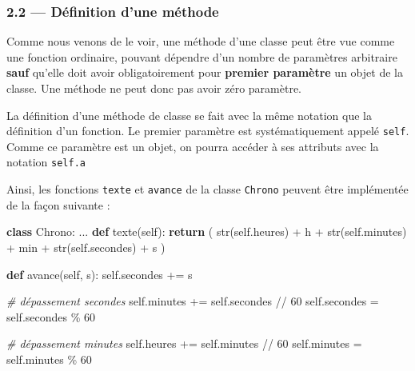 \documentclass[a4paper,17pt]{extarticle}
\newenvironment{Shaded}{}{}
\newcommand{\KeywordTok}[1]{\textcolor[rgb]{0.00,0.44,0.13}{\textbf{{#1}}}}
\newcommand{\DecValTok}[1]{\textcolor[rgb]{0.25,0.63,0.44}{{#1}}}
\newcommand{\StringTok}[1]{\textcolor[rgb]{0.25,0.44,0.63}{{#1}}}
\newcommand{\CommentTok}[1]{\textcolor[rgb]{0.38,0.63,0.69}{\textit{{#1}}}}
\newcommand{\NormalTok}[1]{{#1}}
\newcommand{\VariableTok}[1]{\textcolor[rgb]{0.10,0.09,0.49}{{#1}}}
\newcommand{\ControlFlowTok}[1]{\textcolor[rgb]{0.00,0.44,0.13}{\textbf{{#1}}}}
\newcommand{\OperatorTok}[1]{\textcolor[rgb]{0.40,0.40,0.40}{{#1}}}
\newcommand{\BuiltInTok}[1]{{#1}}
\begin{document}
    \hypertarget{duxe9finition-dune-muxe9thode}{%
\subsubsection{2.2 --- Définition d'une
méthode}\label{duxe9finition-dune-muxe9thode}}

    Comme nous venons de le voir, une méthode d'une classe peut être vue
comme une fonction ordinaire, pouvant dépendre d'un nombre de paramètres
arbitraire \textbf{sauf} qu'elle doit avoir obligatoirement pour
\textbf{premier paramètre} un objet de la classe. Une méthode ne peut
donc pas avoir zéro paramètre.

La définition d'une méthode de classe se fait avec la même notation que
la définition d'un fonction. Le premier paramètre est systématiquement
appelé \texttt{self}. Comme ce paramètre est un objet, on pourra accéder
à ses attributs avec la notation \texttt{self.a}
\begin{exemple}
    Ainsi, les fonctions \texttt{texte} et \texttt{avance} de la classe
\texttt{Chrono} peuvent être implémentée de la façon suivante :

\begin{Shaded}
\begin{Highlighting}[]
\KeywordTok{class}\NormalTok{ Chrono:}
\NormalTok{    ...}
    \KeywordTok{def}\NormalTok{ texte(}\VariableTok{self}\NormalTok{):}
        \ControlFlowTok{return}\NormalTok{ (  }\BuiltInTok{str}\NormalTok{(}\VariableTok{self}\NormalTok{.heures)   }\OperatorTok{+} \StringTok{\textquotesingle{}h \textquotesingle{}}
                \OperatorTok{+} \BuiltInTok{str}\NormalTok{(}\VariableTok{self}\NormalTok{.minutes)  }\OperatorTok{+} \StringTok{\textquotesingle{}min \textquotesingle{}}
                \OperatorTok{+} \BuiltInTok{str}\NormalTok{(}\VariableTok{self}\NormalTok{.secondes) }\OperatorTok{+} \StringTok{\textquotesingle{}s\textquotesingle{}}\NormalTok{   )}

    \KeywordTok{def}\NormalTok{ avance(}\VariableTok{self}\NormalTok{, s):}
        \VariableTok{self}\NormalTok{.secondes }\OperatorTok{+=}\NormalTok{ s}
        
        \CommentTok{\# dépassement secondes}
        \VariableTok{self}\NormalTok{.minutes }\OperatorTok{+=} \VariableTok{self}\NormalTok{.secondes }\OperatorTok{//} \DecValTok{60}
        \VariableTok{self}\NormalTok{.secondes }\OperatorTok{=} \VariableTok{self}\NormalTok{.secondes }\OperatorTok{\%}  \DecValTok{60}

        \CommentTok{\# dépassement minutes}
        \VariableTok{self}\NormalTok{.heures }\OperatorTok{+=} \VariableTok{self}\NormalTok{.minutes }\OperatorTok{//} \DecValTok{60}
        \VariableTok{self}\NormalTok{.minutes }\OperatorTok{=} \VariableTok{self}\NormalTok{.minutes }\OperatorTok{\%}  \DecValTok{60}
\end{Highlighting}
\end{Shaded}

        \end{exemple}
\end{document}

